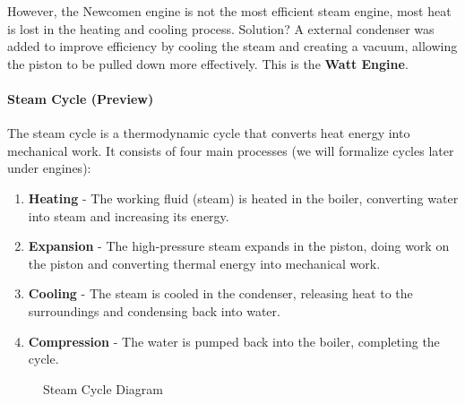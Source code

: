 \documentclass[11pt]{report}
\begin{document}
However, the Newcomen engine is not the most efficient steam engine, most heat is lost in the heating and cooling process. Solution? A external condenser was added to improve efficiency by cooling the steam and creating a vacuum, allowing the piston to be pulled down more effectively. This is the \textbf{Watt Engine}.

\paragraph{Steam Cycle (Preview)} The steam cycle is a thermodynamic cycle that converts heat energy into mechanical work. It consists of four main processes (we will formalize cycles later under engines): 
\begin{enumerate}
    \item \textbf{Heating} - The working fluid (steam) is heated in the boiler, converting water into steam and increasing its energy.
    \item \textbf{Expansion} - The high-pressure steam expands in the piston, doing work on the piston and converting thermal energy into mechanical work.
    \item \textbf{Cooling} - The steam is cooled in the condenser, releasing heat to the surroundings and condensing back into water.
    \item \textbf{Compression} - The water is pumped back into the boiler, completing the cycle.
\end{enumerate}

\begin{figure}[h!]
    \centering
    \caption{Steam Cycle Diagram}
\end{figure}
\end{document}

